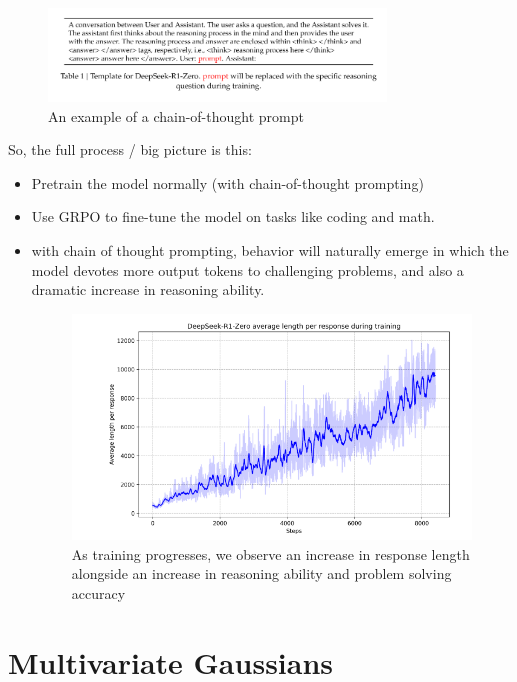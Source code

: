 \documentclass[12pt]{article}
\begin{document}
\begin{figure}[H]
    \centering
    \includegraphics[width=0.8\textwidth]{./deepseekcot.png} %
\caption{An example of a chain-of-thought prompt}
\end{figure}

So, the full process / big picture is this:
\begin{itemize}
\item Pretrain the model normally (with chain-of-thought prompting)
\item Use GRPO to fine-tune the model on tasks like coding and math. 
\item with chain of thought prompting, behavior will naturally emerge in which the model devotes more output tokens to challenging problems, and also a dramatic increase in reasoning ability. 
\begin{figure}[H]
    \centering
    \includegraphics[width=1.0\textwidth]{./deepseekresponse.png} %
\caption{As training progresses, we observe an increase in response length alongside an increase in reasoning ability and problem solving accuracy}
\end{figure}
\end{itemize}

\section{Multivariate Gaussians}
\end{document}
